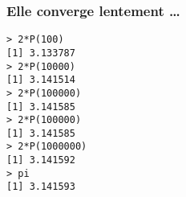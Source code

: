 \documentclass[10pt]{beamer}
\begin{document}
\begin{frame}[fragile]
  \frametitle{Elle converge lentement \dots}
  \begin{lstlisting}
> 2*P(100)
[1] 3.133787
> 2*P(10000)
[1] 3.141514
> 2*P(100000)
[1] 3.141585
> 2*P(100000)
[1] 3.141585
> 2*P(1000000)
[1] 3.141592
> pi
[1] 3.141593
\end{lstlisting}

\end{frame}



\end{document}

